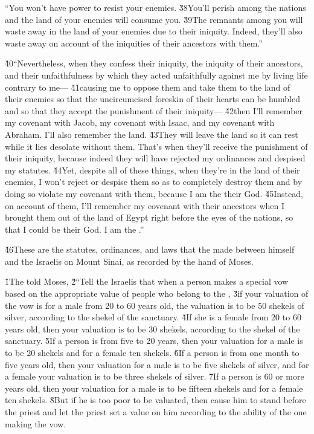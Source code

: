 ``You won't have power to resist your enemies. \v{38}You'll perish among the nations and the land of your enemies will consume you. \v{39}The remnants among you will waste away in the land of your enemies due to their iniquity. Indeed, they'll also waste away on account of the iniquities of their ancestors with them.''

\v{40}``Nevertheless, when they confess their iniquity, the iniquity of their ancestors, and their unfaithfulness by which they acted unfaithfully against me by living life contrary to me--- \v{41}causing me to oppose them and take them to the land of their enemies so that the uncircumcised foreskin of their hearts can be humbled and so that they accept the punishment of their iniquity--- \v{42}then I'll remember my covenant with Jacob, my covenant with Isaac, and my covenant with Abraham. I'll also remember the land. \v{43}They will leave the land so it can rest while it lies desolate without them. That's when they'll receive the punishment of their iniquity, because indeed they will have rejected my ordinances and despised my statutes. \v{44}Yet, despite all of these things, when they're in the land of their enemies, I won't reject or despise them so as to completely destroy them and by doing so violate my covenant with them, because I am the  their God. \v{45}Instead, on account of them, I'll remember my covenant with their ancestors when I brought them out of the land of Egypt right before the eyes of the nations, so that I could be their God. I am the .''

\v{46}These are the statutes, ordinances, and laws that the  made between himself and the Israelis on Mount Sinai, as recorded by the hand of Moses.

\v{1}The  told Moses, \v{2}``Tell the Israelis that when a person makes a special vow based on the appropriate value of people who belong to the , \v{3}if your valuation of the vow is for a male from 20 to 60 years old, the valuation is to be 50 shekels of silver, according to the shekel of the sanctuary. \v{4}If she is a female from 20 to 60 years old, then your valuation is to be 30 shekels, according to the shekel of the sanctuary. \v{5}If a person is from five to 20 years, then your valuation for a male is to be 20 shekels and for a female ten shekels. \v{6}If a person is from one month to five years old, then your valuation for a male is to be five shekels of silver, and for a female your valuation is to be three shekels of silver. \v{7}If a person is 60 or more years old, then your valuation for a male is to be fifteen shekels and for a female ten shekels. \v{8}But if he is too poor to be valuated, then cause him to stand before the priest and let the priest set a value on him according to the ability of the one making the vow.

